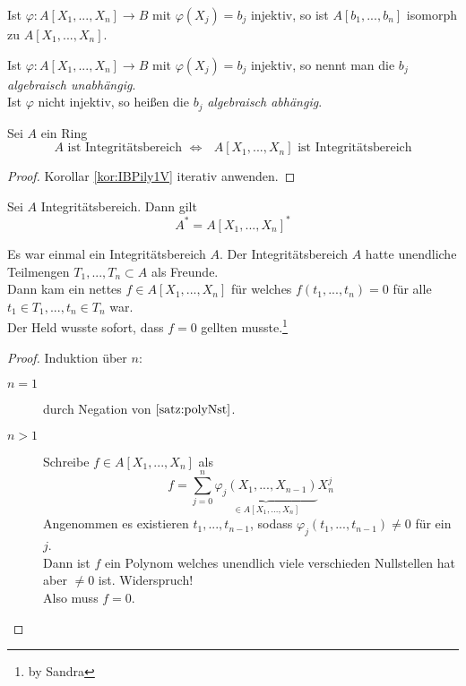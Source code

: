 	\begin{kor}
		Ist $\varphi:A[X_1,...,X_n]\to B$ mit $\varphi(X_j)=b_j$ injektiv, so ist $A[b_1,...,b_n]$ isomorph zu $A[X_1,...,X_n]$.
	\end{kor}

	\begin{definition}
		Ist $\varphi:A[X_1,...,X_n]\to B$ mit $\varphi(X_j)=b_j$ injektiv, so nennt man die $b_j$ \emph{algebraisch unabhängig}.\\
		Ist $\varphi$ nicht injektiv, so heißen die $b_j$ \emph{algebraisch abhängig}.
	\end{definition}

	\begin{satz}
		Sei $A$ ein Ring
		\[\text{$A$ ist Integritätsbereich }\Leftrightarrow\text{ $A[X_1,...,X_n]$ ist Integritätsbereich}\]
	\end{satz}
	\begin{proof}
		Korollar \ref{kor:IBPily1V} iterativ anwenden.
	\end{proof}

	\begin{satz}
		Sei $A$ Integritätsbereich. Dann gilt
		\[A^*=A[X_1,...,X_n]^*\]
	\end{satz}

	\begin{satz}
		Es war einmal ein Integritätsbereich $A$. Der Integritätsbereich $A$ hatte unendliche Teilmengen $T_1,...,T_n\subset A$ als Freunde.\\
		Dann kam ein nettes $f\in A[X_1,...,X_n]$ für welches $f(t_1,...,t_n)=0$ für alle $t_1\in T_1,...,t_n\in T_n$ war.\\
		Der Held wusste sofort, dass $f=0$ gellten musste.\footnote{by Sandra}
	\end{satz}
	\begin{proof}
		Induktion über $n$:
		\begin{description}
			\item[$n=1$] durch Negation von $\ref{satz:polyNst}$.
			\item[$n>1$] Schreibe $f\in A[X_1,...,X_n]$ als
			\[f=\sum_{j=0}^n\underbrace{\varphi_j(X_1,...,X_{n-1})}_{\in A[X_1,...,X_n]}X_n^j\]
			Angenommen es existieren $t_1,...,t_{n-1}$, sodass $\varphi_j(t_1,...,t_{n-1})\neq 0$ für ein $j$.\\
			Dann ist $f$ ein Polynom welches unendlich viele verschieden Nullstellen hat aber $\neq 0$ ist. Widerspruch!\\
			Also muss $f=0$.
		\end{description}
	\end{proof}

